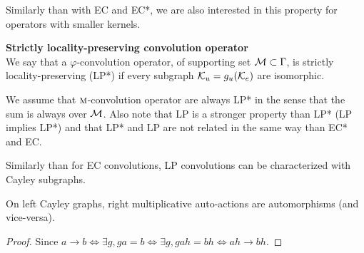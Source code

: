Similarly than with EC and EC*, we are also interested in this property for operators with smaller kernels.

\begin{definition}\textbf{Strictly locality-preserving convolution operator}\\
We say that a $\varphi$-convolution operator, of supporting set $\mathcal{M} \subset \Gamma$, is strictly locality-preserving (LP*) if every subgraph  $\mathcal{K}_u = g_u(\mathcal{K}_e)$ are isomorphic.
\end{definition}

\begin{remark}
We assume that $\operatorname{\textsc{m}}$-convolution operator are always LP* in the sense that the sum is always over $\mathcal{M}$. Also note that LP is a stronger property than LP* (\ie LP implies LP*) and that LP* and LP are not related in the same way than EC* and EC.
\end{remark}

Similarly than for EC convolutions, LP convolutions can be characterized with Cayley subgraphs.

\begin{lemma}
On left Cayley graphs, right multiplicative auto-actions are automorphisms (and vice-versa).
\label{lem:lat}
\end{lemma}
\begin{proof}
Since $a \rightarrow b \Leftrightarrow \exists g, ga = b \Leftrightarrow \exists g, gah = bh \Leftrightarrow ah \rightarrow bh$.
\end{proof}

